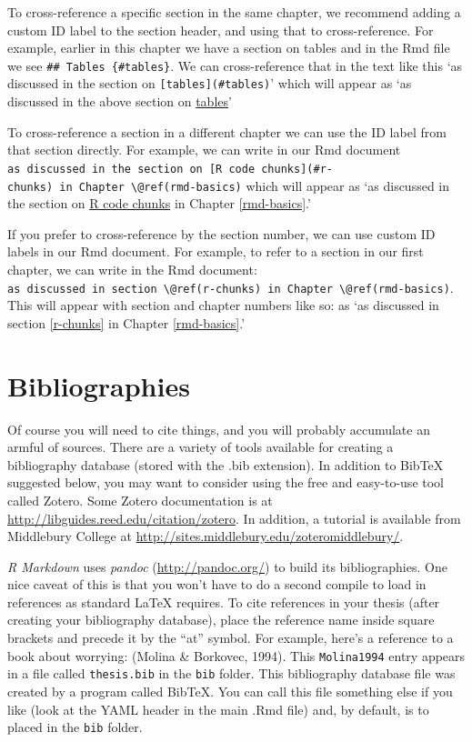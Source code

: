 \documentclass [11pt, proquest] {uwthesis}[2015/03/03]
\begin{document}
To cross-reference a specific section in the same chapter, we recommend adding a custom ID label to the section header, and using that to cross-reference. For example, earlier in this chapter we have a section on tables and in the Rmd file we see \texttt{\#\#\ Tables\ \{\#tables\}}. We can cross-reference that in the text like this `as discussed in the section on \texttt{{[}tables{]}(\#tables)}' which will appear as `as discussed in the above section on \protect\hyperlink{tables}{tables}'

To cross-reference a section in a different chapter we can use the ID label from that section directly. For example, we can write in our Rmd document \texttt{as\ discussed\ in\ the\ section\ on\ {[}R\ code\ chunks{]}(\#r-chunks)\ in\ Chapter\ \textbackslash{}@ref(rmd-basics)} which will appear as `as discussed in the section on \protect\hyperlink{r-chunks}{R code chunks} in Chapter \ref{rmd-basics}.'

If you prefer to cross-reference by the section number, we can use custom ID labels in our Rmd document. For example, to refer to a section in our first chapter, we can write in the Rmd document: \texttt{as\ discussed\ in\ section\ \textbackslash{}@ref(r-chunks)\ in\ Chapter\ \textbackslash{}@ref(rmd-basics)}. This will appear with section and chapter numbers like so: as `as discussed in section \ref{r-chunks} in Chapter \ref{rmd-basics}.'

\hypertarget{bibliographies}{%
\section{Bibliographies}\label{bibliographies}}

Of course you will need to cite things, and you will probably accumulate an armful of sources. There are a variety of tools available for creating a bibliography database (stored with the .bib extension). In addition to BibTeX suggested below, you may want to consider using the free and easy-to-use tool called Zotero. Some Zotero documentation is at \url{http://libguides.reed.edu/citation/zotero}. In addition, a tutorial is available from Middlebury College at \url{http://sites.middlebury.edu/zoteromiddlebury/}.

\emph{R Markdown} uses \emph{pandoc} (\url{http://pandoc.org/}) to build its bibliographies. One nice caveat of this is that you won't have to do a second compile to load in references as standard LaTeX requires. To cite references in your thesis (after creating your bibliography database), place the reference name inside square brackets and precede it by the ``at'' symbol. For example, here's a reference to a book about worrying: (Molina \& Borkovec, 1994). This \texttt{Molina1994} entry appears in a file called \texttt{thesis.bib} in the \texttt{bib} folder. This bibliography database file was created by a program called BibTeX. You can call this file something else if you like (look at the YAML header in the main .Rmd file) and, by default, is to placed in the \texttt{bib} folder.
\end{document}
